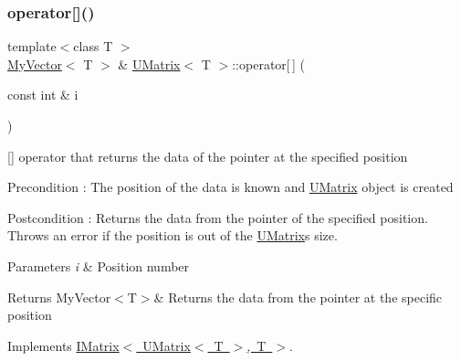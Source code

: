 \subsubsection{\texorpdfstring{operator[]()}{operator[]()}\hspace{0.1cm}{\footnotesize\ttfamily [1/2]}}
{\footnotesize\ttfamily template$<$class T $>$ \\
\mbox{\hyperlink{class_my_vector}{My\+Vector}}$<$ T $>$ \& \mbox{\hyperlink{class_u_matrix}{U\+Matrix}}$<$ T $>$\+::operator\mbox{[}$\,$\mbox{]} (\begin{DoxyParamCaption}\item[{const int \&}]{i }\end{DoxyParamCaption})\hspace{0.3cm}{\ttfamily [virtual]}}



\mbox{[}\mbox{]} operator that returns the data of the pointer at the specified position 

\begin{DoxyPrecond}{Precondition}
\+: The position of the data is known and \mbox{\hyperlink{class_u_matrix}{U\+Matrix}} object is created 
\end{DoxyPrecond}
\begin{DoxyPostcond}{Postcondition}
\+: Returns the data from the pointer of the specified position. Throws an error if the position is out of the \mbox{\hyperlink{class_u_matrix}{U\+Matrix}}\textquotesingle{}s size. 
\end{DoxyPostcond}

\begin{DoxyParams}{Parameters}
{\em i} & Position number \\
\hline
\end{DoxyParams}
\begin{DoxyReturn}{Returns}
My\+Vector$<$\+T$>$\& Returns the data from the pointer at the specific position 
\end{DoxyReturn}


Implements \mbox{\hyperlink{class_i_matrix_a3cfb2490e2849c6c19c1979066a64818}{I\+Matrix$<$ U\+Matrix$<$ T $>$, T $>$}}.

\mbox{\label{class_u_matrix_ab0ad5eda96c9a8bb9ca8c69d4bb8d5f8}} 
